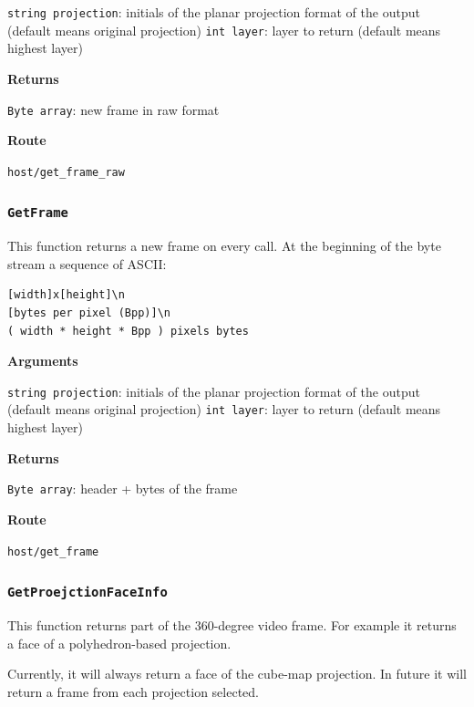 \documentclass{article}
\begin{document}
\texttt{string projection}: initials of the planar projection format of the output (default means original projection)
\texttt{int layer}: layer to return (default means highest layer)

\textbf{Returns}

\texttt{Byte array}: new frame in raw format

\textbf{Route}

\texttt{host/get_frame_raw}


\subsubsection*{\texttt{GetFrame}}

This function returns a new frame on every call.
At the beginning of the byte stream a sequence of ASCII:
\begin{verbatim}
[width]x[height]\n
[bytes per pixel (Bpp)]\n
( width * height * Bpp ) pixels bytes
\end{verbatim}

\textbf{Arguments}

\texttt{string projection}: initials of the planar projection format of the output (default means original projection)
\texttt{int layer}: layer to return (default means highest layer)

\textbf{Returns}

\texttt{Byte array}: header + bytes of the frame

\textbf{Route}

\texttt{host/get_frame}


\subsubsection*{\texttt{GetProejctionFaceInfo}}

This function returns part of the 360-degree video frame.
For example it returns a face of a polyhedron-based projection.

Currently, it will always return a face of the cube-map projection.
In future it will return a frame from each projection selected.
\end{document}
